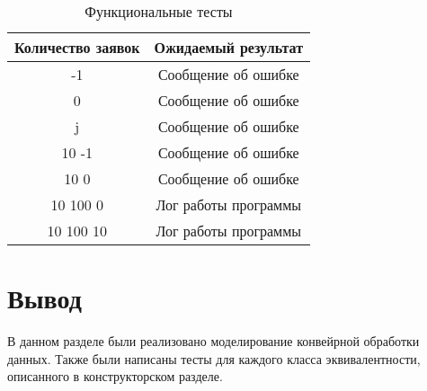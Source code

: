 \begin{table}[h!]
	\begin{center}
    \begin{threeparttable}
        \captionsetup{justification=raggedright,singlelinecheck=off}
        \caption{\label{tab:tests}Функциональные тесты}
        \begin{tabular}{|c|c|}
			\hline
            \textbf{Количество заявок} & \textbf{Ожидаемый результат} \\ [2mm]
            \hline
            -1
            &
            Сообщение об ошибке
            \\
            \hline
            0
            &
            Сообщение об ошибке
            \\
            \hline
            j
            &
            Сообщение об ошибке
            \\
            \hline
            10
            -1
            &
            Сообщение об ошибке
            \\
            \hline
            10
            0
            &
            Сообщение об ошибке
            \\
            \hline
            10
            100
            0
            &
            Лог работы программы
            \\
            \hline
            10
            100
            10
            &
            Лог работы программы
            \\
            \hline
		\end{tabular}
    \end{threeparttable} 
	\end{center}
\end{table}

\section{Вывод}

В данном разделе были реализовано моделирование конвейрной обработки данных.
Также были написаны тесты для каждого класса эквивалентности, описанного в
конструкторском разделе.
